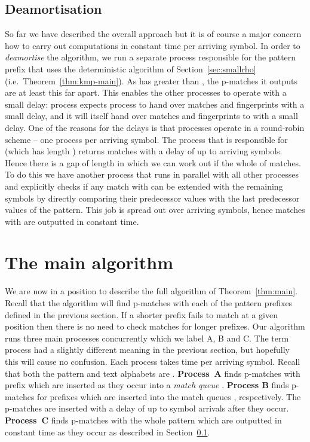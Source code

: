 \documentclass[11pt,a4paper]{article}
\theoremstyle{theorem}
\newcommand{\pmatches}{\mbox{p-matches}\xspace}
\newcommand{\procA}{\textup{A}\xspace}
\newcommand{\procB}{\textup{B}\xspace}
\newcommand{\procC}{\textup{C}\xspace}
\begin{document}
\subsection{Deamortisation}\label{sec:deamortisation}

So far we have described the overall approach but it is of course a major concern how to carry out computations in constant time per arriving symbol. In order to \emph{deamortise} the algorithm, we run a separate process responsible for the pattern prefix  that uses the deterministic algorithm of Section~\ref{sec:smallrho} (i.e.~Theorem~\ref{thm:kmp-main}). As  has  greater than , the \pmatches it outputs are at least this far apart. This enables the other processes to operate with a small delay: process  expects process  to hand over matches and fingerprints with a small delay, and it will itself hand over matches and fingerprints to  with a small delay. One of the reasons for the delays is that processes operate in a round-robin scheme -- one process per arriving symbol. The process that is responsible for  (which has length ) returns matches with a delay of up to  arriving symbols. Hence there is a gap of length  in which we can work out if the whole of  matches. To do this we have another process that runs in parallel with all other processes and explicitly checks if any match with  can be extended with the remaining  symbols by directly comparing their predecessor values with the last  predecessor values of the pattern. This job is spread out over  arriving symbols, hence matches with  are outputted in constant time.



\section{The main algorithm}



We are now in a position to describe the full algorithm of Theorem~\ref{thm:main}. Recall that the algorithm will find \pmatches with
each of the pattern prefixes  defined in the previous section. If a shorter prefix fails to match at a given
position then there is no need to check matches for longer
prefixes.
Our algorithm runs three main processes concurrently which we label \procA, \procB and \procC.
The term process had a slightly different meaning in the previous section, but hopefully this will cause no confusion.
Each process takes  time per arriving symbol. Recall that both the pattern and text alphabets are . \textbf{Process~\procA} finds \pmatches with prefix  which are inserted as they occur into a \emph{match queue} . \textbf{Process \procB} finds \pmatches for prefixes  which are inserted into the match queues , respectively.
The \pmatches are inserted with a delay of up to 
symbol arrivals after they occur. \textbf{Process~\procC} finds \pmatches with the whole pattern  which are outputted in constant time as they occur as described in Section~\ref{sec:deamortisation}.
\end{document}

